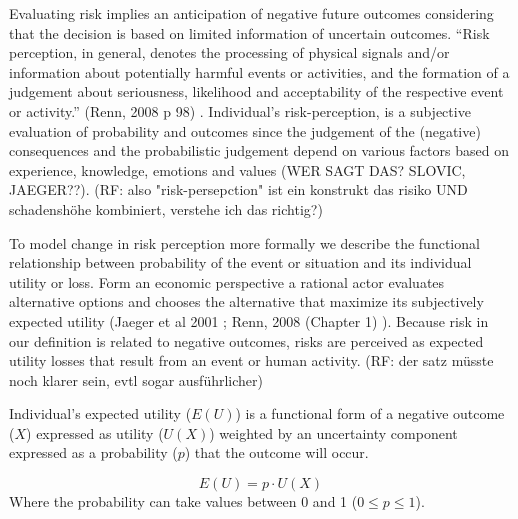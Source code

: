 Evaluating risk implies an anticipation of negative future outcomes considering that the decision is based on limited information of uncertain outcomes. ``Risk perception, in general, denotes the processing of physical signals and/or information about potentially harmful events or activities, and the formation of a judgement about seriousness, likelihood and acceptability of the respective event or activity.''  (Renn, 2008 p 98) \citep[98]{Renn:2008wq}. Individual's risk-perception, is a subjective evaluation of probability and outcomes since the judgement of the (negative) consequences and the probabilistic judgement depend on various factors based on experience, knowledge, emotions and values (WER SAGT DAS? SLOVIC, JAEGER??).   (RF: also "risk-persepction" ist ein konstrukt das risiko UND schadenshöhe kombiniert, verstehe ich das richtig?) 
 
To model change in risk perception more formally we describe the functional relationship between probability of the event or situation and its individual utility or loss. 
Form an economic perspective a rational actor evaluates alternative options and chooses the alternative that maximize its subjectively expected utility (Jaeger et al 2001 \citep{Jaeger:2001wv}; Renn, 2008 (Chapter 1) \citep{Renn:2008wq}). Because risk in our definition is related to negative outcomes, risks are perceived as expected utility losses that result from an event or human activity. (RF: der satz müsste noch klarer sein, evtl sogar ausführlicher)
  
Individual's expected utility ($E(U)$) is a functional form of a negative outcome ($X$) expressed as utility ($U(X)$) weighted by an uncertainty component expressed as a probability ($p$) that the outcome will occur.  

\begin{equation}
   E(U) =  p \cdot U(X)  \nonumber
\end{equation}
Where the probability can take values between 0 and 1 ($0 \leq p \leq 1$). 

